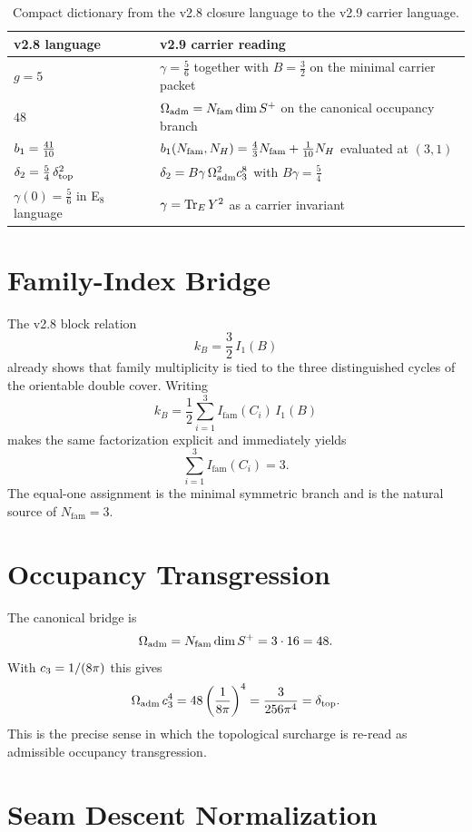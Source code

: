 \begin{table}[H]
\centering
\small
\begin{tabularx}{\linewidth}{@{}lX@{}}
\toprule
v2.8 language & v2.9 carrier reading \\
\midrule
$g=5$ & $\gamma=\frac56$ together with $B=\frac32$ on the minimal carrier packet \\
$48$ & $\Omega_{\mathrm{adm}}=N_{\mathrm{fam}}\dim S^+$ on the canonical occupancy branch \\
$b_1=\frac{41}{10}$ & $b_1(N_{\mathrm{fam}},N_H)=\frac43 N_{\mathrm{fam}}+\frac1{10}N_H$ evaluated at $(3,1)$ \\
$\delta_2=\frac54\,\delta_{\mathrm{top}}^2$ & $\delta_2 = B\gamma\,\Omega_{\mathrm{adm}}^2c_3^8$ with $B\gamma=\frac54$ \\
$\gamma(0)=\frac56$ in E$_8$ language & $\gamma=\operatorname{Tr}_EY^2$ as a carrier invariant \\
\bottomrule
\end{tabularx}
\caption{Compact dictionary from the v2.8 closure language to the v2.9 carrier language.}
\end{table}

\section{Family-Index Bridge}

The v2.8 block relation
\[
k_B=\frac32\,I_1(B)
\]
already shows that family multiplicity is tied to the three distinguished cycles of the orientable double cover. Writing
\[
k_B=\frac12\sum_{i=1}^{3} I_{\mathrm{fam}}(C_i)\,I_1(B)
\]
makes the same factorization explicit and immediately yields
\[
\sum_{i=1}^{3} I_{\mathrm{fam}}(C_i)=3.
\]
The equal-one assignment is the minimal symmetric branch and is the natural source of $N_{\mathrm{fam}}=3$.

\section{Occupancy Transgression}

The canonical bridge is
\[
\Omega_{\mathrm{adm}} = N_{\mathrm{fam}}\dim S^+ = 3\cdot 16 = 48.
\]
With $c_3=1/(8\pi)$ this gives
\[
\Omega_{\mathrm{adm}}\,c_3^4
= 48\left(\frac{1}{8\pi}\right)^4
= \frac{3}{256\pi^4}
= \delta_{\mathrm{top}}.
\]
This is the precise sense in which the topological surcharge is re-read as admissible occupancy transgression.

\section{Seam Descent Normalization}

